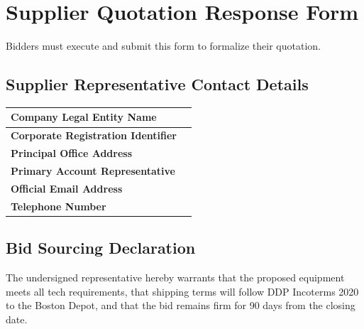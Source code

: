 \section{Supplier Quotation Response Form}
\label{sec:response}

Bidders must execute and submit this form to formalize their quotation.

\subsection{Supplier Representative Contact Details}
\vspace{0.1cm}
\begin{tabularx}{\textwidth}{|>{\raggedright\arraybackslash}p{4.5cm}|L|}
    \hline
    \textbf{Company Legal Entity Name} & \\
    \hline
    \textbf{Corporate Registration Identifier} & \\
    \hline
    \textbf{Principal Office Address} & \\
    \hline
    \textbf{Primary Account Representative} & \\
    \hline
    \textbf{Official Email Address} & \\
    \hline
    \textbf{Telephone Number} & \\
    \hline
\end{tabularx}

\newpage

\subsection{Bid Sourcing Declaration}
The undersigned representative hereby warrants that the proposed equipment meets all tech requirements, that shipping terms will follow DDP Incoterms 2020 to the Boston Depot, and that the bid remains firm for 90 days from the closing date.

